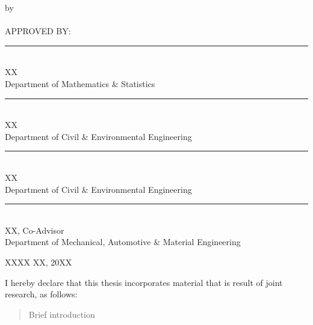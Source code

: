 \documentclass[
11pt, %
oneside, %
english, %
doublespacing,
liststotoc, %
parskip, %
consistentlayout, %
]{MastersDoctoralThesis} %
\begin{document}
\begin{titlepage}
\begin{center}
{\huge \bfseries \ttitle\par}\vspace{0.4cm} 

\vfill
\large {by}
\\
\large {\authorname \\}
\large {APPROVED BY:} \\[0.2cm]
\noindent\rule{12cm}{0.3pt} \\
{XX \\
  Department of Mathematics \& Statistics} \\[0.8cm]
\noindent\rule{12cm}{0.3pt} \\
\vspace{1em}
{XX \\
Department of Civil \& Environmental Engineering} \\[0.8cm]
\noindent\rule{12cm}{0.3pt} \\
{XX \\
Department of Civil \& Environmental Engineering} \\[0.8cm]
\noindent\rule{12cm}{0.3pt} \\
{XX, Co-Advisor \\
Department of Mechanical, Automotive \& Material Engineering }\\[0.8cm]
{\begin{flushright}\large XXXX XX, 20XX \end{flushright}} %
\vfill
\end{center}
\end{titlepage}



\begin{declaration}
  \setcounter{page}{3}
  \addchaptertocentry{\authorshipname}

  I hereby declare that this thesis incorporates material that is
  result of joint research, as follows:

\end{declaration}

\begin{abstract}
  \addchaptertocentry{\abstractname}Brief introduction

\end{abstract}
\end{document}
